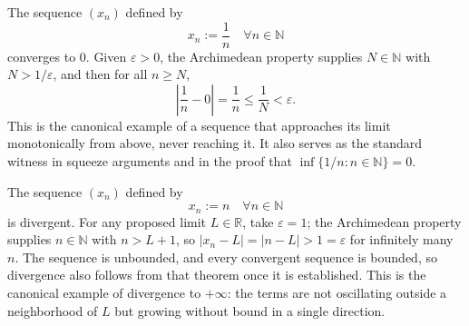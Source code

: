 \begin{exposition}
\label{ex:sequence-reciprocal}

The sequence $(x_n)$ defined by
\[
    x_n := \frac{1}{n} \quad \forall n \in \mathbb{N}
\]
converges to $0$. Given $\varepsilon > 0$, the Archimedean property
supplies $N \in \mathbb{N}$ with $N > 1/\varepsilon$, and then for all
$n \ge N$,
\[
    \left|\frac{1}{n} - 0\right| = \frac{1}{n} \le \frac{1}{N} < \varepsilon.
\]
This is the canonical example of a sequence that approaches its limit
monotonically from above, never reaching it. It also serves as the
standard witness in squeeze arguments and in the proof that
$\inf\{1/n : n \in \mathbb{N}\} = 0$.
\end{exposition}

\begin{exposition}
\label{ex:sequence-natural}

The sequence $(x_n)$ defined by
\[
    x_n := n \quad \forall n \in \mathbb{N}
\]
is divergent. For any proposed limit $L \in \mathbb{R}$, take
$\varepsilon = 1$; the Archimedean property supplies $n \in \mathbb{N}$
with $n > L + 1$, so $|x_n - L| = |n - L| > 1 = \varepsilon$ for
infinitely many $n$. The sequence is unbounded, and every convergent
sequence is bounded, so divergence also follows from that theorem once
it is established. This is the canonical example of divergence to
$+\infty$: the terms are not oscillating outside a neighborhood of $L$
but growing without bound in a single direction.
\end{exposition}
































































